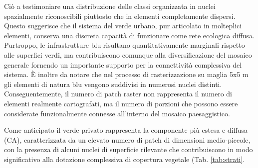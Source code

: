 \documentclass[
  a4paper,
]{book}
\begin{document}
Ciò a testimoniare una distribuzione delle classi organizzata in nuclei spazialmente riconoscibili piuttosto che in elementi completamente dispersi.
Questo suggerisce che il sistema del verde urbano, pur articolato in molteplici elementi, conserva una discreta capacità di funzionare come rete ecologica diffusa.
Purtroppo, le infrastrutture blu risultano quantitativamente marginali rispetto alle superfici verdi, ma contribuiscono comunque alla diversificazione del mosaico generale fornendo un importante supporto per la connettività complessiva del sistema.
È inoltre da notare che nel processo di rasterizzazione su maglia 5x5 m gli elementi di natura blu vengono suddivisi in numerosi nuclei distinti.
Conseguentemente, il numero di patch raster non rappresenta il numero di elementi realmente cartografati, ma il numero di porzioni che possono essere considerate funzionalmente connesse all'interno del mosaico paesaggistico.

Come anticipato il verde privato rappresenta la componente più estesa e diffusa (CA), caratterizzata da un elevato numero di patch di dimensioni medio-piccole, con la presenza di alcuni nuclei di superficie rilevante che contribuiscono in modo significativo alla dotazione complessiva di copertura vegetale (Tab. \ref{tab:strati}.
\end{document}
